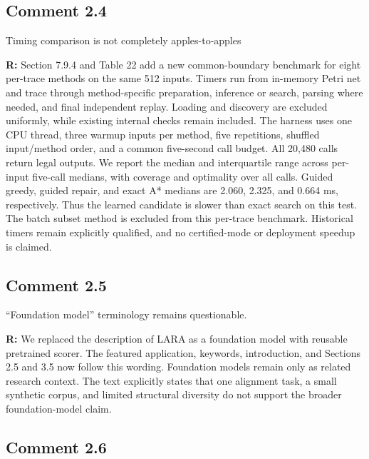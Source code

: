 \documentclass[11pt,a4paper]{article}
\newenvironment{reviewercomment}{%
  \begin{list}{}{\setlength{\leftmargin}{1.5em}%
    \setlength{\rightmargin}{0pt}\setlength{\topsep}{0.5em}}%
  \item\relax\color{reviewerred}\ignorespaces
}{\end{list}}
\begin{document}
\subsection*{Comment 2.4}

\begin{reviewercomment}Timing comparison is not completely apples-to-apples\end{reviewercomment}

{\color{black}\textbf{R:} Section 7.9.4 and Table 22 add a new common-boundary benchmark for eight per-trace methods on the same 512 inputs. Timers run from in-memory Petri net and trace through method-specific preparation, inference or search, parsing where needed, and final independent replay. Loading and discovery are excluded uniformly, while existing internal checks remain included. The harness uses one CPU thread, three warmup inputs per method, five repetitions, shuffled input/method order, and a common five-second call budget. All 20,480 calls return legal outputs. We report the median and interquartile range across per-input five-call medians, with coverage and optimality over all calls. Guided greedy, guided repair, and exact A* medians are 2.060, 2.325, and 0.664 ms, respectively. Thus the learned candidate is slower than exact search on this test. The batch subset method is excluded from this per-trace benchmark. Historical timers remain explicitly qualified, and no certified-mode or deployment speedup is claimed.\par}

\subsection*{Comment 2.5}

\begin{reviewercomment}“Foundation model” terminology remains questionable.\end{reviewercomment}

{\color{black}\textbf{R:} We replaced the description of LARA as a foundation model with reusable pretrained scorer. The featured application, keywords, introduction, and Sections 2.5 and 3.5 now follow this wording. Foundation models remain only as related research context. The text explicitly states that one alignment task, a small synthetic corpus, and limited structural diversity do not support the broader foundation-model claim.\par}

\subsection*{Comment 2.6}
\end{document}
